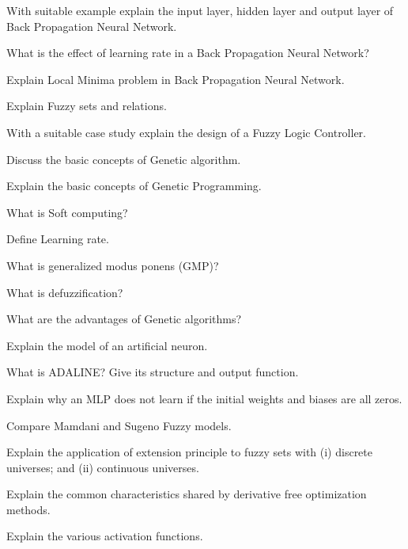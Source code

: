 \item \iitem With suitable example explain the input layer, hidden layer and output layer
  of Back Propagation Neural Network.
\Or
\item \iitem What is the effect of learning rate in a Back Propagation Neural Network?
\item Explain Local Minima problem in Back Propagation Neural Network.
\ene
\ene

\item \iitem Explain Fuzzy sets and relations.
\Or
\item With a suitable case study explain the design of a Fuzzy Logic Controller.
\ene

\item \iitem Discuss the basic concepts of Genetic algorithm.
\Or
\item Explain the basic concepts of Genetic Programming.
\ene

\markC
\ene

\newpage

\sub{\subj}
\maxtime

\partA

\iitem What is Soft computing?
\item Define Learning rate.
\item What is generalized modus ponens (GMP)?
\item What is defuzzification?
\item What are the advantages of Genetic algorithms?

\markA
\partB

\item Explain the model of an artificial neuron.
\item What is ADALINE? Give its structure and output function.
\item Explain why an MLP does not learn if the initial weights and
  biases are all zeros.
\item Compare Mamdani and Sugeno Fuzzy models.
\item Explain the application of extension principle to fuzzy sets with
  (i) discrete universes; and (ii) continuous universes.
\item Explain the common characteristics shared by derivative free optimization
  methods.

\markB
\partCo

\item \iitem Explain the various activation functions.
\Or

